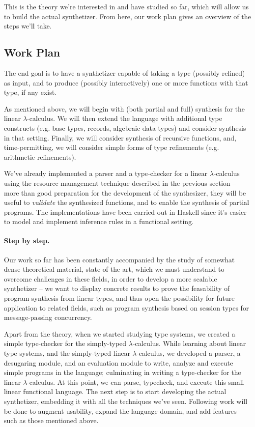 \documentclass{llncs}
\newcommand{\mypara}[1]{\paragraph{\textbf{#1}.}}
\begin{document}
This is the theory we're interested in and have studied so far,
which will allow us to build the actual synthetizer. From here,
our work plan gives an overview of the steps we'll take.

\subsection{Work Plan}

The end goal is to have a synthetizer capable of
taking a type (possibly refined) as input, and to produce (possibly
interactively) one or more functions with that type, if any exist.

As mentioned above, we will begin with (both partial and full)
synthesis for the linear $\lambda$-calculus. We will then extend the
language with additional type constructs (e.g. base types, records,
algebraic data types) and consider synthesis in that setting. Finally,
we will consider synthesis of recursive functions, and,
time-permitting, we will consider simple forms of type refinements
(e.g. arithmetic refinements).

We've already implemented a parser and a type-checker for a linear
$\lambda$-calculus using the resource management technique described
in the previous section -- more than
good preparation for the development of the synthesizer, they will be
useful to \emph{validate} the synthesized functions, and to enable
the synthesis of partial programs.
%
The implementations have been carried out in Haskell since it's easier
to model and implement inference rules in a functional setting.

\mypara{Step by step} Our work so far has been constantly accompanied
by the study of somewhat dense theoretical material, state of the art,
which we must understand to overcome challenges in these fields, in
order to develop a more scalable synthetizer -- we want to display
concrete results to prove the feasability of program synthesis from
linear types, and thus open the possibility for future application to
related fields, such as program synthesis based on session types for
message-passing concurrency.

Apart from the theory, when we started studying type systems, we
created a simple type-checker for the simply-typed $\lambda$-calculus.
While learning about linear type systems, and the simply-typed linear
$\lambda$-calculus, we developed a parser, a desugaring module, and an
evaluation module to write, analyze and execute simple programs in the
language; culminating in writing a type-checker for the linear
$\lambda$-calculus. At this point, we can parse, typecheck, and
execute this small linear functional language.  The next step is to
start developing the actual synthetizer, embedding it with all the
techniques we've seen. Following work will be done to augment
usability, expand the language domain, and add features such as those
mentioned above.
\end{document}
